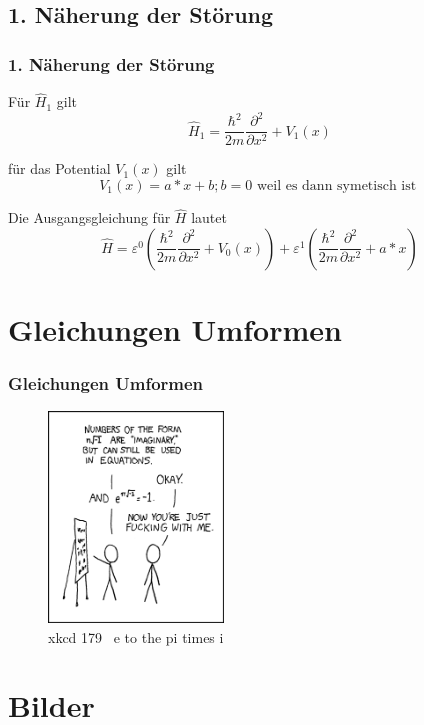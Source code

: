 \documentclass[aspectratio=169]{beamer}
\begin{document}
\subsection{ 1. N\"aherung der St\"orung }
\begin{frame} 
  \frametitle{ 1. N\"aherung der St\"orung }

  F\"ur $\hat H_1$ gilt
  \[
    \hat H_1 = \frac{\hbar^2}{2m} \frac{\partial^2}{\partial x^2} + V_1(x)
  \]

  f\"ur das Potential $V_1(x)$ gilt
  \[
    V_1(x) = a*x +b ; b = 0 \text{ weil es dann symetisch ist }
  \]

  Die Ausgangsgleichung f\"ur $\hat{H}$ lautet
  \[
    \hat{H} = \varepsilon^0 ( \frac{\hbar^2}{2m} \frac{\partial^2}{\partial x^2} + V_0(x) )
	      + \varepsilon^1 ( \frac{\hbar^2}{2m} \frac{\partial^2}{\partial x^2} + a*x )
  \]
\end{frame}


\section{ Gleichungen Umformen }
\begin{frame}
  \frametitle{ Gleichungen Umformen }
  \begin{figure}
    \centering
    \includegraphics[height=5.6cm]{./179_e_to_the_pi_times_i.png}
    \caption{ xkcd 179 \textendash \ e to the pi times i }
    \label{abb:179_e_to_the_pi_times_i}
  \end{figure}
\end{frame}

\section{ Bilder }
\end{document}
